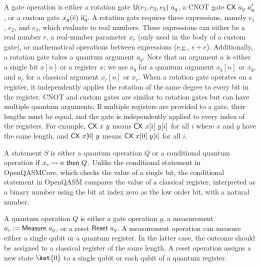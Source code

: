A gate operation is either a rotation gate $\irotate{e_1}{e_2}{e_3}{a_q}$, a
CNOT gate $\icnot{a_q}{a_q'}$, or a custom gate
$\icustom{x_g}{\rep{e}}{\rep{a_q}}$.
%
A rotation gate requires three expressions, namely $e_1$, $e_2$, and $e_3$,
which evaluate to real numbers.
%
These expressions can either be a real number $r$, a real-number parameter
$x_r$ (only used in the body of a custom gate), or mathematical operations
between expressions (e.g., $e+e$).
%
Additionally, a rotation gate takes a quantum argument $a_q$.
%
Note that an argument $a$ is either a single bit $x[n]$ or a register $x$;
%
we use $a_q$ for a quantum argument $x_q[n]$ or $x_q$, and $a_c$ for a
classical argument $x_c[n]$ or $x_c$.
%
When a rotation gate operates on a register, it independently applies the
rotation of the same degree to every bit in the register.
%
CNOT and custom gates are similar to rotation gates but can have multiple
quantum arguments.
%
If multiple registers are provided to a gate, their lengths must be equal, and
the gate is independently applied to every index of the registers.
%
For example, $\icnot{x}{y}$ means $\icnot{x[i]}{y[i]}$ for all $i$ where $x$
and $y$ have the same length, and $\icnot{x[0]}{y}$ means $\icnot{x[0]}{y[i]}$
for all $i$.

A statement $S$ is either a quantum operation $Q$ or a conditional quantum
operation $\iif{x_c}{n}{Q}$.
%
Unlike the conditional statement in OpenQASMCore, which checks the value of a
single bit, the conditional statement in OpenQASM compares the value of a
classical register, interpreted as a binary number using the bit at index zero
as the low order bit, with a natural number.

A quantum operation $Q$ is either a gate operation $g$, a measurement
$\imeasure{a_q}{a_c}$, or a reset $\ireset{a_q}$.
%
A measurement operation can measure either a single qubit or a quantum
register.
%
In the latter case, the outcome should be assigned to a classical register of
the same length.
%
A reset operation assigns a new state $\ket{0}$ to a single qubit or each qubit
of a quantum register.

